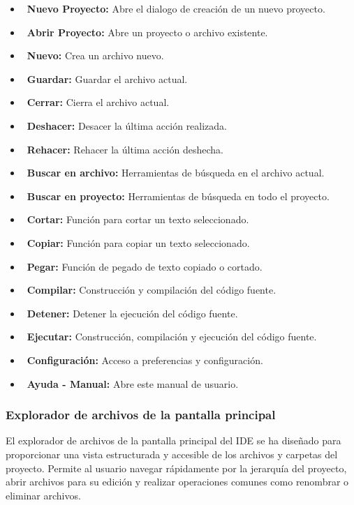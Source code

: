 \documentclass[../main.tex]{subfiles}
\begin{document}
\begin{itemize}

    \item \faFolderPlus\ \textbf{Nuevo Proyecto:} Abre el dialogo de creación de un nuevo proyecto.
    \item \faFolderOpen\ \textbf{Abrir Proyecto:} Abre un proyecto o archivo existente.
    \item \faFile\ \textbf{Nuevo:} Crea un archivo nuevo.
    \item \faSave\ \textbf{Guardar:} Guardar el archivo actual.
    \item \faTimes\ \textbf{Cerrar:} Cierra el archivo actual.
    \item \faUndo\ \textbf{Deshacer:} Desacer la última acción realizada.
    \item \faRedo\ \textbf{Rehacer:} Rehacer la última acción deshecha.
    \item \faSearch\ \textbf{Buscar en archivo:} Herramientas de búsqueda en el archivo actual.
    \item \faSearchPlus\ \textbf{Buscar en proyecto:} Herramientas de búsqueda en todo el proyecto.
    \item \faCut\ \textbf{Cortar:} Función para cortar un texto seleccionado.
    \item \faCopy\ \textbf{Copiar:} Función para copiar un texto seleccionado.
    \item \faPaste\ \textbf{Pegar:} Función de pegado de texto copiado o cortado.
    \item \faHammer\ \textbf{Compilar:} Construcción y compilación del código fuente.
    \item \faStop\ \textbf{Detener:} Detener la ejecución del código fuente.
    \item \faPlay\ \textbf{Ejecutar:} Construcción, compilación y ejecución del código fuente.
    \item \faCog\ \textbf{Configuración:} Acceso a preferencias y configuración.
    \item \faQuestionCircle\ \textbf{Ayuda - Manual:} Abre este manual de usuario.
\end{itemize}

\subsubsection{Explorador de archivos de la pantalla principal}

El explorador de archivos de la pantalla principal del IDE se ha diseñado para proporcionar una vista estructurada y accesible de los 
archivos y carpetas del proyecto. Permite al usuario navegar rápidamente por la jerarquía del proyecto, abrir archivos para su edición y 
realizar operaciones comunes como renombrar o eliminar archivos. 
\end{document}
